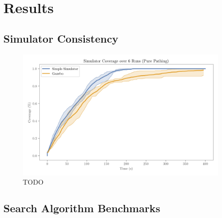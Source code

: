 \section{Results}
\label{sec:results}


\subsection{Simulator Consistency}
\begin{figure}[H]
    \begin{center}
        \includegraphics[width=0.95\textwidth]{./figures/plots/gazebo_vs_simple_sim_pure_pathing.png}
    \end{center}
    \caption{TODO}
    \label{fig:coverage-benchmark}
\end{figure}

\subsection{Search Algorithm Benchmarks}

